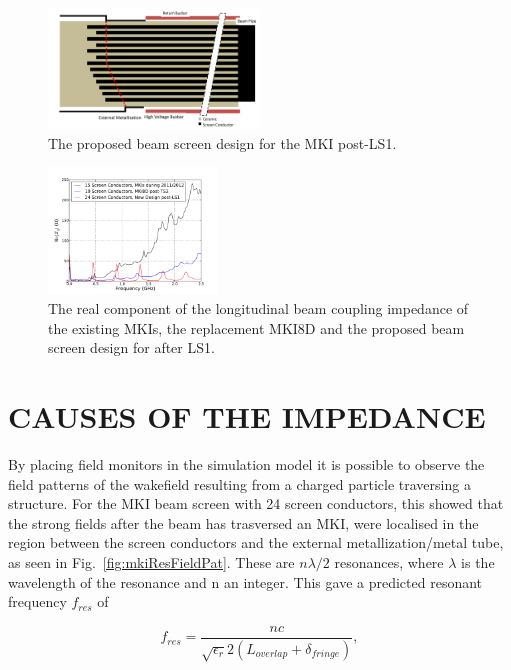 \documentclass{JAC2003}
\begin{document}
\begin{figure}
\includegraphics[width=0.5\textwidth]{mki-final-design.pdf}
\caption{The proposed beam screen design for the MKI post-LS1.}
\label{fig:newScreenDesign}
\end{figure}

\begin{figure}
\begin{center}\includegraphics[width=0.4\textwidth]{realImp.pdf}
\caption{The real component of the longitudinal beam coupling impedance of the existing MKIs, the replacement MKI8D and the proposed beam screen design for after LS1.}
\label{fig:MKIScreenImp}
\end{center}
\end{figure}

\section{CAUSES OF THE IMPEDANCE}

By placing field monitors in the simulation model it is possible to observe the field patterns of the wakefield resulting from a charged particle traversing a structure. For the MKI beam screen with 24 screen conductors, this showed that the strong fields after the beam has trasversed an MKI, were localised in the region between the screen conductors and the external metallization/metal tube, as seen in Fig.~\ref{fig:mkiResFieldPat}. These are $n \lambda /2$ resonances, where $\lambda$ is the wavelength of the resonance and n an integer. This gave a predicted resonant frequency $f_{res}$ of 

\begin{equation}
f_{res} = \frac{nc}{\sqrt{\epsilon_{r}}2 \left( L_{overlap} + \delta_{fringe} \right)},
\label{eqn:imp-overlap-fres}
\end{equation}
\end{document}
